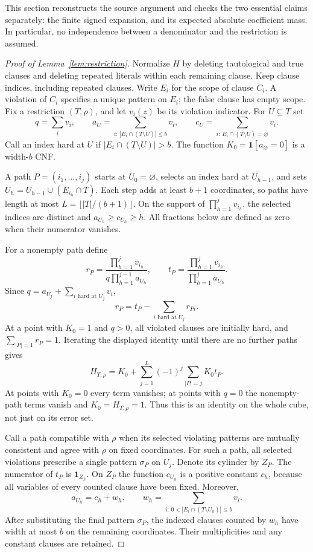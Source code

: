 \documentclass[11pt]{article}
\begin{document}
This section reconstructs the source argument and checks the two essential
claims separately: the finite signed expansion, and its expected absolute
coefficient mass. In particular, no independence between a denominator and
the restriction is assumed.

\begin{proof}[Proof of Lemma~\ref{lem:restriction}]
Normalize $H$ by deleting tautological and true clauses and deleting repeated
literals within each remaining clause. Keep clause indices, including
repeated clauses. Write $E_i$ for the scope of clause $C_i$. A violation of
$C_i$ specifies a unique pattern on $E_i$; the false clause has empty scope.
Fix a restriction $(T,\rho)$, and let $v_i(z)$ be its violation indicator.
For $U\subseteq T$ set
\[
 q=\sum_i v_i,\qquad
 a_U=\sum_{i:\,|E_i\cap(T\setminus U)|\le b}v_i,\qquad
 c_U=\sum_{i:\,E_i\cap(T\setminus U)=\varnothing}v_i.
\]
Call an index hard at $U$ if $|E_i\cap(T\setminus U)|>b$.
The function $K_0=\mathbf1[a_\varnothing=0]$ is a width-$b$ CNF.

A path $P=(i_1,\ldots,i_j)$ starts at $U_0=\varnothing$, selects an index
hard at $U_{h-1}$, and sets $U_h=U_{h-1}\cup(E_{i_h}\cap T)$.
Each step adds at least $b+1$ coordinates, so paths have length at most
$L=\lfloor |T|/(b+1)\rfloor$. On the support of
$\prod_{h=1}^j v_{i_h}$, the selected indices are distinct and
$a_{U_h}\ge c_{U_h}\ge h$.
All fractions below are defined as zero when their numerator vanishes.

For a nonempty path define
\[
 r_P=\frac{\prod_{h=1}^jv_{i_h}}
                {q\prod_{h=1}^{j-1}a_{U_h}},\qquad
 t_P=\frac{\prod_{h=1}^jv_{i_h}}
                {\prod_{h=1}^{j}a_{U_h}}.
\]
Since $q=a_{U_j}+\sum_{i\text{ hard at }U_j}v_i$,
\[
 r_P=t_P-\sum_{i\text{ hard at }U_j}r_{Pi}.
\]
At a point with $K_0=1$ and $q>0$, all violated clauses are initially hard,
and $\sum_{|P|=1}r_P=1$. Iterating the displayed identity until there are
no further paths gives
\begin{equation}\label{eq:audited-expansion}
 H_{T,\rho}=K_0+
   \sum_{j=1}^{L}(-1)^j\sum_{|P|=j}K_0t_P.
\end{equation}
At points with $K_0=0$ every term vanishes; at points with $q=0$ the
nonempty-path terms vanish and $K_0=H_{T,\rho}=1$.
Thus this is an identity on the whole cube, not just on its error set.

Call a path compatible with $\rho$ when its selected violating patterns
are mutually consistent and agree with $\rho$ on fixed coordinates.
For such a path, all selected violations prescribe a single pattern
$\sigma_P$ on $U_j$. Denote its cylinder by $Z_P$.
The numerator of $t_P$ is $\mathbf1_{Z_P}$.
On $Z_P$ the function $c_{U_h}$ is a positive constant $c_h$, because all
variables of every counted clause have been fixed. Moreover,
\[
 a_{U_h}=c_h+w_h,
 \qquad
 w_h=\sum_{i:\,0<|E_i\cap(T\setminus U_h)|\le b}v_i.
\]
After substituting the final pattern $\sigma_P$, the indexed clauses
counted by $w_h$ have width at most $b$ on the remaining coordinates.
Their multiplicities and any constant clauses are retained.


\end{proof}
\end{document}
